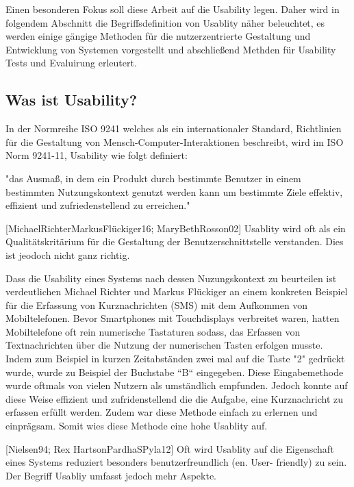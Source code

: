 Einen besonderen Fokus soll diese Arbeit auf die Usability legen. Daher wird in folgendem Abschnitt die Begriffsdefinition von Usablity näher beleuchtet, es werden einige 
gängige Methoden für die nutzerzentrierte Gestaltung und Entwicklung von Systemen vorgestellt und abschließend Methden für Usability Tests und Evaluirung erleutert. 

\subsection{Was ist Usability?}

In der Normreihe ISO 9241 welches als ein internationaler Standard, Richtlinien für die Gestaltung von Mensch-Computer-Interaktionen beschreibt, wird im ISO Norm 9241-11,  Usability wie folgt definiert:

"das Ausmaß, in dem ein Produkt durch bestimmte Benutzer in einem bestimmten Nutzungskontext genutzt werden kann um bestimmte Ziele effektiv, effizient und zufriedenstellend zu erreichen."

[MichaelRichterMarkusFlückiger16; MaryBethRosson02] Usablity wird  oft als ein Qualitätskritärium für die Gestaltung der Benutzerschnittstelle verstanden. Dies ist jeodoch nicht ganz richtig.

Dass die Usability eines Systems nach dessen Nuzungskontext zu beurteilen ist verdeutlichen Michael Richter und Markus Flückiger an einem konkreten Beispiel für die Erfassung 
von Kurznachrichten (SMS) mit dem Aufkommen von Mobiltelefonen.  Bevor Smartphones mit Touchdisplays verbreitet waren, hatten Mobiltelefone oft rein numerische Tastaturen sodass, das Erfassen 
von Textnachrichten über die Nutzung der numerischen Tasten erfolgen musste. Indem zum Beispiel in kurzen Zeitabständen zwei mal auf die Taste "2" gedrückt wurde, wurde zu Beispiel der Buchstabe ``B`` eingegeben. 
Diese Eingabemethode wurde oftmals von vielen Nutzern als umständlich empfunden. Jedoch konnte auf diese Weise effizient und zufridenstellend die die Aufgabe, eine Kurznachricht zu erfassen erfüllt werden. 
Zudem war diese Methode einfach zu erlernen und einprägsam. Somit wies diese Methode eine hohe Usablity auf. 

[Nielsen94; Rex HartsonPardhaSPyla12] Oft wird Usablity auf die Eigenschaft eines Systems reduziert besonders benutzerfreundlich (en. User- friendly) zu sein. Der Begriff Usabliy umfasst jedoch mehr Aspekte. 

